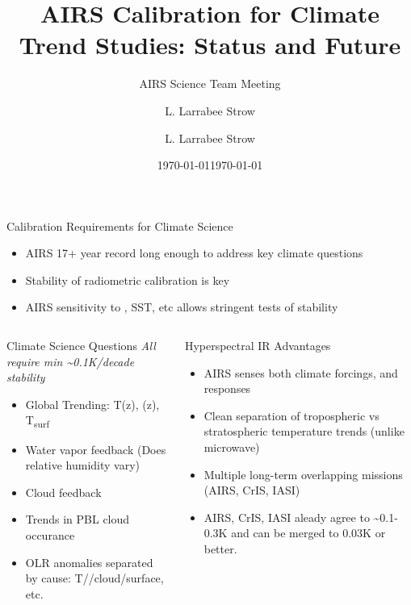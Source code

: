 \documentclass[10pt,t]{beamer}
\author{L. Larrabee Strow}
\date{\today}
\title{\large AIRS Calibration for Climate Trend Studies: Status and Future}
\subtitle{\footnotesize{AIRS Science Team Meeting}}
\date{\vspace{0.1in}\footnotesize{\today\vfill}}
\author{L. Larrabee Strow\inst{1,2}}
\institute[UMBC]{\inst{1} UMBC Physics Dept. \and \inst{2}UMBC JCET}
\begin{document}
\maketitle
{}


\begin{frame}[label={sec:orgec4751a},shrink=30]{Calibration Requirements for Climate Science}
\vspace{-0.1in}
\begin{large}
\begin{itemize}
\item AIRS 17+ year record long enough to address key climate questions
\item Stability of radiometric calibration is key
\item AIRS sensitivity to \cd, SST, etc allows stringent tests of stability
\end{itemize}
\end{large}
\vspace{-0.2in}
\begin{columns}
\begin{column}{0.55\columnwidth}
\begin{block}{Climate Science Questions}
\vspace{0.05in}
\emph{All require min \textasciitilde{}0.1K/decade stability}
\vspace{-0.05in}
\begin{itemize}
\item Global Trending: T(z), \water(z), T\textsubscript{surf}
\item Water vapor feedback (Does relative humidity vary)
\item Cloud feedback
\item Trends in PBL cloud occurance
\item OLR anomalies separated by cause: T/\water/cloud/surface, etc.
\end{itemize}
\end{block}
\end{column}

\begin{column}{0.55\columnwidth}
\begin{block}{Hyperspectral IR Advantages}
\begin{itemize}
\item AIRS senses both climate forcings, and responses
\item Clean separation of tropospheric vs stratospheric temperature trends (unlike microwave)
\item Multiple long-term overlapping missions (AIRS, CrIS, IASI)
\item AIRS, CrIS, IASI aleady agree to \textasciitilde{}0.1-0.3K and can be merged to 0.03K or better.
\end{itemize}
\end{block}
\end{column}
\end{columns}




\end{frame}
\end{document}

